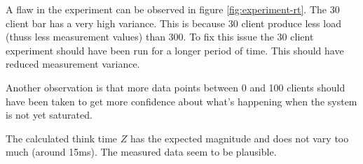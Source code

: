 \documentclass[a4paper]{article}
\begin{document}
A flaw in the experiment can be observed in figure \ref{fig:experiment-rt}. The 30 client bar has a very high variance. This is because 30 client produce less load (thuss less measurement values) than 300. To fix this issue the 30 client experiment should have been run for a longer period of time. This should have reduced measurement variance.

Another observation is that more data points between 0 and 100 clients should have been taken to get more confidence about what's happening when the system is not yet saturated.

The calculated think time $Z$ has the expected magnitude and does not vary too much (around 15ms). The measured data seem to be plausible.


\pagebreak




\end{document}
